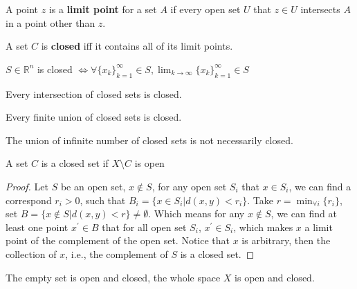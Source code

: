 			\begin{definition}
				A point $z$ is a \textbf{limit point} for a set $A$ if every open set $U$ that $z\in U$ intersects $A$ in a point other than $z$.
			\end{definition}


			\begin{definition}
				A set $C$ is \textbf{closed} iff it contains all of its limit points.
			\end{definition}

			\begin{theorem}
				$S\in \mathbb{R}^n$ is closed $\iff \forall \{x_k\}_{k=1}^\infty \in S, \lim_{k \rightarrow \infty} \{x_k\}_{k=1}^\infty \in S$
			\end{theorem}

			\begin{theorem}
				Every intersection of closed sets is closed.
			\end{theorem}

			\begin{theorem}
				Every finite union of closed sets is closed.
			\end{theorem}

			\begin{remark}
				The union of infinite number of closed sets is not necessarily closed.
			\end{remark}

			\begin{theorem}
				A set $C$ is a closed set if $X \setminus C$ is open
			\end{theorem}

			\begin{proof}
				Let $S$ be an open set, $x \notin S$, for any open set $S_i$ that $x\in S_i$, we can find a correspond $r_i > 0$, such that $B_i = \{x \in S_i | d(x, y) < r_i\}$. Take $r = \min_{\forall i}\{r_i\}$, set $B = \{x \notin S|d(x, y) < r\} \neq \emptyset$. Which means for any $x\notin S$, we can find at least one point $x^\prime \in B$ that for all open set $S_i$, $x^\prime \in S_i$, which makes $x$ a limit point of the complement of the open set. Notice that $x$ is arbitrary, then the collection of $x$, i.e., the complement of $S$ is a closed set.
			\end{proof}

			\begin{remark}
				The empty set is open and closed, the whole space $X$ is open and closed.
			\end{remark}